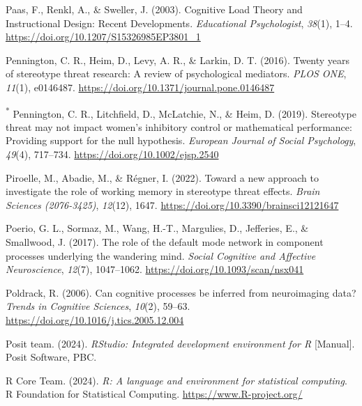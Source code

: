 \documentclass[
  stu, a4paper,floatsintext]{apa7}
\newlength{\cslhangindent}
\newenvironment{CSLReferences}[2] %
 {\begin{list}{}{%
  \setlength{\itemindent}{0pt}
  \setlength{\leftmargin}{0pt}
  \setlength{\parsep}{0pt}
  \ifodd #1
   \setlength{\leftmargin}{\cslhangindent}
   \setlength{\itemindent}{-1\cslhangindent}
  \fi
  \setlength{\itemsep}{#2\baselineskip}}}
 {\end{list}}
\begin{document}
\begin{CSLReferences}{1}{0}
Paas, F., Renkl, A., \& Sweller, J. (2003). Cognitive {Load Theory} and {Instructional Design}: {Recent Developments}. \emph{Educational Psychologist}, \emph{38}(1), 1--4. \url{https://doi.org/10.1207/S15326985EP3801_1}

Pennington, C. R., Heim, D., Levy, A. R., \& Larkin, D. T. (2016). Twenty years of stereotype threat research: A review of psychological mediators. \emph{PLOS ONE}, \emph{11}(1), e0146487. \url{https://doi.org/10.1371/journal.pone.0146487}

\textsuperscript{*} Pennington, C. R., Litchfield, D., McLatchie, N., \& Heim, D. (2019). Stereotype threat may not impact women's inhibitory control or mathematical performance: {Providing} support for the null hypothesis. \emph{European Journal of Social Psychology}, \emph{49}(4), 717--734. \url{https://doi.org/10.1002/ejsp.2540}

Piroelle, M., Abadie, M., \& Régner, I. (2022). Toward a new approach to investigate the role of working memory in stereotype threat effects. \emph{Brain Sciences (2076-3425)}, \emph{12}(12), 1647. \url{https://doi.org/10.3390/brainsci12121647}

Poerio, G. L., Sormaz, M., Wang, H.-T., Margulies, D., Jefferies, E., \& Smallwood, J. (2017). The role of the default mode network in component processes underlying the wandering mind. \emph{Social Cognitive and Affective Neuroscience}, \emph{12}(7), 1047--1062. \url{https://doi.org/10.1093/scan/nsx041}

Poldrack, R. (2006). Can cognitive processes be inferred from neuroimaging data? \emph{Trends in Cognitive Sciences}, \emph{10}(2), 59--63. \url{https://doi.org/10.1016/j.tics.2005.12.004}

Posit team. (2024). \emph{{RStudio}: {Integrated} development environment for {R}} {[}Manual{]}. Posit Software, PBC.

R Core Team. (2024). \emph{R: A language and environment for statistical computing}. R Foundation for Statistical Computing. \url{https://www.R-project.org/}


\end{CSLReferences}
\end{document}
